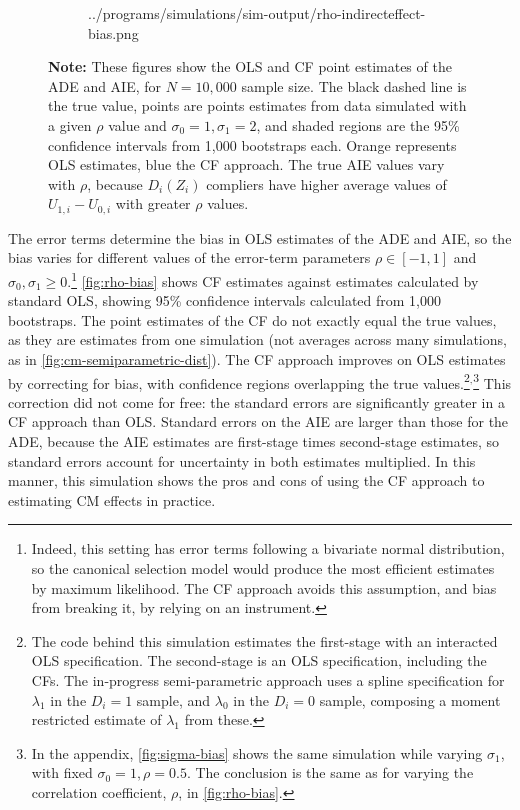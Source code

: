\begin{figure}[h!]
\begin{subfigure}[c]{0.475\textwidth}
{            ../programs/simulations/sim-output/rho-indirecteffect-bias.png}
    \end{subfigure}
    \label{fig:rho-bias}
    \justify
    \footnotesize    
    \textbf{Note:}
    These figures show the OLS and CF point estimates of the ADE and AIE, for $N = 10,000$ sample size.
    The black dashed line is the true value, points are points estimates from data simulated with a given $\rho$ value and $\sigma_0 = 1, \sigma_1 = 2$, and shaded regions are the 95\% confidence intervals from 1,000 bootstraps each.
    Orange represents OLS estimates, blue the CF approach.
    The true AIE values vary with $\rho$, because $D_i(Z_i)$ compliers have higher average values of $U_{1,i} - U_{0,i}$ with greater $\rho$ values.
\end{figure}

The error terms determine the bias in OLS estimates of the ADE and AIE, so the bias varies for different values of the error-term parameters $\rho \in [-1, 1]$ and $\sigma_0, \sigma_1 \geq 0$.\footnote{
    Indeed, this setting has error terms following a bivariate normal distribution, so the canonical \cite{heckman1974shadow} selection model would produce the most efficient estimates by maximum likelihood.
    The CF approach avoids this assumption, and bias from breaking it, by relying on an instrument.
}
\autoref{fig:rho-bias} shows CF estimates against estimates calculated by standard OLS, showing 95\% confidence intervals calculated from 1,000 bootstraps.
The point estimates of the CF do not exactly equal the true values, as they are estimates from one simulation (not averages across many simulations, as in \autoref{fig:cm-semiparametric-dist}).
The CF approach improves on OLS estimates by correcting for bias, with confidence regions overlapping the true values.\footnote{
    The code behind this simulation estimates the first-stage with an interacted OLS specification.
    The second-stage is an OLS specification, including the CFs.
    The in-progress semi-parametric approach uses a spline specification for $\lambda_1$ in the $D_i = 1$ sample, and $\lambda_0$ in the $D_i = 0$ sample, composing a moment restricted estimate of $\lambda_1$ from these. 
}$^,$\footnote{
    In the appendix, \autoref{fig:sigma-bias} shows the same simulation while varying $\sigma_1$, with fixed $\sigma_0 = 1, \rho = 0.5$.
    The conclusion is the same as for varying the correlation coefficient, $\rho$, in \autoref{fig:rho-bias}.
}
This correction did not come for free: the standard errors are significantly greater in a CF approach than OLS.
Standard errors on the AIE are larger than those for the ADE, because the AIE estimates are first-stage times second-stage estimates, so standard errors account for uncertainty in both estimates multiplied.
In this manner, this simulation shows the pros and cons of using the CF approach to estimating CM effects in practice.
